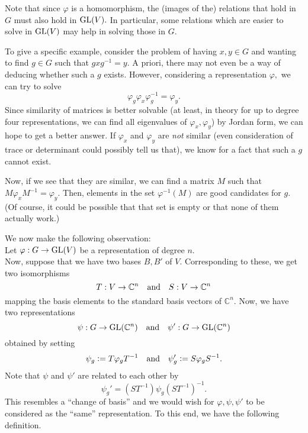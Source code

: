 \begin{ex}
	Note that since $\varphi$ is a homomorphism, the (images of the) relations that hold in $G$ must also hold in $\operatorname{GL}(V).$ In particular, some relations which are easier to solve in $\operatorname{GL}(V)$ may help in solving those in $G.$

	To give a specific example, consider the problem of having $x, y \in G$ and wanting to find $g \in G$ such that $gxg^{-1} = y.$ A priori, there may not even be a way of deducing whether such a $g$ exists. However, considering a representation $\varphi,$ we can try to solve
	\begin{equation*} 
		\varphi_g\varphi_x\varphi_g^{-1} = \varphi_y.
	\end{equation*}
	Since similarity of matrices is better solvable (at least, in theory for up to degree four representations, we can find all eigenvalues of $\varphi_x, \varphi_y$) by Jordan form, we can hope to get a better answer. If $\varphi_x$ and $\varphi_y$ are \emph{not} similar (even consideration of trace or determinant could possibly tell us that), we know for a fact that such a $g$ cannot exist.

	Now, if we see that they are similar, we can find a matrix $M$ such that $M\varphi_xM^{-1} = \varphi_y.$ Then, elements in the set $\varphi^{-1}(M)$ are good candidates for $g.$ (Of course, it could be possible that that set is empty or that none of them actually work.)
\end{ex}

We now make the following observation:\\
Let $\varphi : G \to \operatorname{GL}(V)$ be a representation of degree $n.$\\
Now, suppose that we have two bases $B, B'$ of $V.$ Corresponding to these, we get two isomorphisms
\begin{equation*} 
	T : V \to \mathbb{C}^n \quad\text{and}\quad S : V \to \mathbb{C}^n
\end{equation*}
mapping the basis elements to the standard basis vectors of $\mathbb{C}^n.$ Now, we have two representations
\begin{equation*} 
	\psi : G \to \operatorname{GL} (\mathbb{C}^n) \quad\text{and}\quad \psi' : G \to \operatorname{GL} (\mathbb{C}^n)
\end{equation*}
obtained by setting
\begin{equation*} 
	\psi_g \vcentcolon= T\varphi_gT^{-1} \quad\text{and}\quad \psi'_g \vcentcolon= S\varphi_gS^{-1}.
\end{equation*} 
Note that $\psi$ and $\psi'$ are related to each other by
\begin{equation*} 
	\psi_g' = (ST^{-1})\psi_g(ST^{-1})^{-1}.
\end{equation*}
This resembles a ``change of basis'' and we would wish for $\varphi, \psi, \psi'$ to be considered as the ``same'' representation. To this end, we have the following definition.

